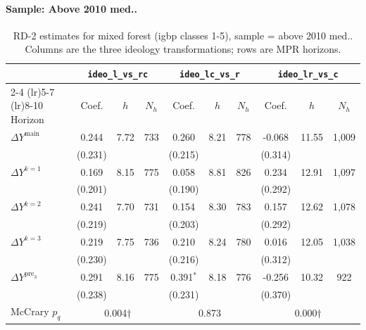 \documentclass[11pt]{article}
\begin{document}
\paragraph{Sample: Above 2010 med..}
\begin{table}[H]
\centering
\scriptsize
\caption{RD-2 estimates for mixed forest (igbp classes 1-5), sample = above 2010 med..
Columns are the three ideology transformations; rows are MPR horizons.}
\label{tab:rd2_mixed_forest_above}
\begin{tabular}{l ccc ccc ccc}
\toprule
 & \multicolumn{3}{c}{\texttt{ideo\_l\_vs\_rc}}
 & \multicolumn{3}{c}{\texttt{ideo\_lc\_vs\_r}}
 & \multicolumn{3}{c}{\texttt{ideo\_lr\_vs\_c}} \\
\cmidrule(lr){2-4} \cmidrule(lr){5-7} \cmidrule(lr){8-10}
Horizon & Coef. & $h$ & $N_h$ & Coef. & $h$ & $N_h$ & Coef. & $h$ & $N_h$ \\
\midrule
$\Delta Y^{\text{main}}$ & 0.244 & 7.72 & 733 & 0.260 & 8.21 & 778 & -0.068 & 11.55 & 1,009 \\
 & (0.231) &  &  & (0.215) &  &  & (0.314) &  &  \\
\addlinespace[1pt]
$\Delta Y^{k=1}$ & 0.169 & 8.15 & 775 & 0.058 & 8.81 & 826 & 0.234 & 12.91 & 1,097 \\
 & (0.201) &  &  & (0.190) &  &  & (0.292) &  &  \\
\addlinespace[1pt]
$\Delta Y^{k=2}$ & 0.241 & 7.70 & 731 & 0.154 & 8.30 & 783 & 0.157 & 12.62 & 1,078 \\
 & (0.219) &  &  & (0.203) &  &  & (0.292) &  &  \\
\addlinespace[1pt]
$\Delta Y^{k=3}$ & 0.219 & 7.75 & 736 & 0.210 & 8.24 & 780 & 0.016 & 12.05 & 1,038 \\
 & (0.230) &  &  & (0.216) &  &  & (0.312) &  &  \\
\addlinespace[1pt]
$\Delta Y^{\text{pre}_3}$ & 0.291 & 8.16 & 775 & 0.391$^{*}$ & 8.18 & 776 & -0.256 & 10.32 & 922 \\
 & (0.238) &  &  & (0.231) &  &  & (0.370) &  &  \\
\addlinespace[1pt]
\midrule
McCrary $p_q$ & \multicolumn{3}{c}{0.004$\dagger$} & \multicolumn{3}{c}{0.873} & \multicolumn{3}{c}{0.000$\dagger$} \\
\bottomrule
\end{tabular}
\end{table}
\end{document}
